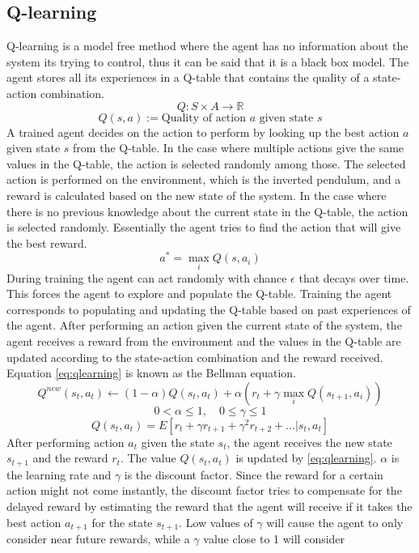 \documentclass{LTHtwocol} %
\begin{document}
\subsection{Q-learning}
Q-learning is a model free method where the agent has no information about the system its trying to control, thus it can be said that it is a black box model.
The agent stores all its experiences in a Q-table that contains the quality of a state-action combination.
\[ Q : S \times A  \to \mathbb{R} \]
\[Q(s,a) := \text{Quality of action $a$ given state  $s$} \]
A trained agent decides on the action to perform by looking up the best action $a$ given state $s$ from the Q-table.
In the case where multiple actions give the same values in the Q-table, the action is selected randomly among those.
The selected action is performed on the environment, which is the inverted pendulum, and a reward is calculated based on the new state of the system.
In the case where there is no previous knowledge about the current state in the Q-table, the action is selected randomly.
Essentially the agent tries to find the action that will give the best reward.
\[ a^* = \max_i Q(s,a_i) \]
During training the agent can act randomly with chance $\epsilon$ that decays over time.
This forces the agent to explore and populate the Q-table.
Training the agent corresponds to populating and updating the Q-table based on past experiences of the agent.
After performing an action given the current state of the system, the agent receives a reward from the environment and the values in the Q-table are updated according to the state-action combination and the reward received.
Equation \eqref{eq:qlearning} is known as the Bellman equation.
\begin{equation}
Q^{new}(s_t,a_t) \leftarrow (1 - \alpha)Q(s_t,a_t) + \alpha (r_t + \gamma \max_i Q(s_{t+1},a_i ))
\label{eq:qlearning}
\end{equation}
\[ 0 < \alpha \leq 1, \quad 0 \leq \gamma \leq 1  \]
\[ Q(s_t,a_t) = E[r_t + \gamma r_{t+1} + \gamma^2 r_{t+2} + \hdots | s_t,a_t] \]
After performing action $a_t$ given the state $s_t$, the agent receives the new state $s_{t+1}$ and the reward $r_t$. The value $Q(s_t,a_t)$ is updated by \eqref{eq:qlearning}. $\alpha$ is the learning rate and $\gamma$ is the discount factor. Since the reward for a certain action might not come instantly, the discount factor tries to compensate for the delayed reward by estimating the reward that the agent will receive if it takes the best action $a_{t+1}$ for the state $s_{t+1}$. Low values of $\gamma$ will cause the agent to only consider near future rewards, while a $\gamma$ value close to 1 will consider
\end{document}
